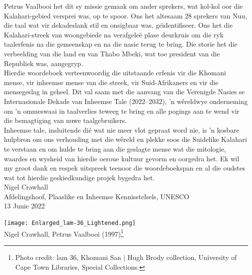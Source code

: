 Petrus Vaalbooi het dit sy missie gemaak om ander sprekers, wat
kol-kol oor die Kalahari-gebied versprei was, op te spoor. Ons het
altesaam 28 sprekers van N\textipa{\textvertline}uu, die taal wat vir
dekadeslank stil en onsigbaar was, ge\"{\i}dentifiseer. Ons het die
Kalahari-streek van woongebiede na verafgele\"{e} plase deurkruis om
die ryk taalerfenis na die gemeenskap en na die nasie terug te bring.
Die storie het die verbeelding van die land en van Thabo Mbeki, wat
toe president van die Republiek was, aangegryp.\\

Hierdie woordeboek verteenwoordig die uitstaande erfenis vir die
\textipa{\textdoublebarpipe}Khomani mense, vir inheemse mense van die
streek, vir Suid-Afrikaners en vir die mensegeslag in geheel. Dit val
saam met die aanvang van die Verenigde Nasies se Internasionale Dekade
van Inheemse Tale (2022--2032), 'n w\^{e}reldwye onderneming om 'n
ommeswaai in taalverlies teweeg te bring en alle pogings aan te wend
vir die bemagtiging van nuwe taalgebruikers.\\

Inheemse tale, insluitende di\'{e} wat nie meer vlot gepraat word nie,
is 'n kosbare hulpbron om ons verhouding met die w\^{e}reld en plekke
soos die Suidelike Kalahari te verstaan en om hulde te bring aan die
geslagte mense wat die mitologie, waardes en wysheid van hierdie
oeroue kultuur gevorm en oorgedra het. Ek wil my groot dank en respek
uitspreek teenoor die woordeboekspan en al die oudstes wat tot hierdie
geskiedkundige projek bygedra het.\\

Nigel Crawhall\\[1em]

Afdelingshoof, Plaaslike en Inheemse Kennisstelsels, UNESCO\\[1em]

13 Junie 2022

\vfill

\begin{center}
    \texttt{[image: Enlarged\_lam-36\_Lightened.png]}\\
    Nigel Crawhall, Petrus Vaalbooi (1997)\footnote{Photo credit: lam
    36, \textipa{\textdoublebarpipe}Khomani San $|$ Hugh Brody
    collection, University of Cape Town Libraries, Special
    Collections.}
\end{center}

\newpage

